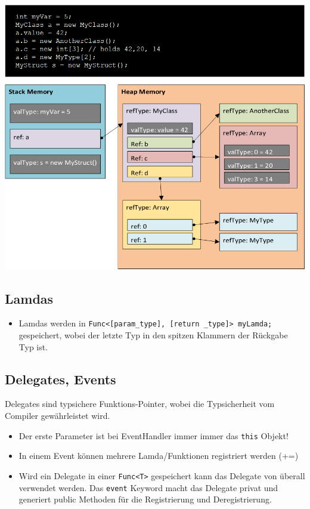 \documentclass[
a4paper,
oneside,
10pt,
fleqn,
headsepline,
toc=listofnumbered, 
bibliography=totocnumbered]{scrartcl}
\begin{document}
\begin{minipage}[t]{0.9\textwidth}
	\centering
	\includegraphics[width=0.8\linewidth]{images/reference_value_type}
\end{minipage}
\clearpage

\subsection{Lamdas}
\begin{itemize}
	\item Lamdas werden in \lstinline|Func<[param_type], [return _type]> myLamda;| gespeichert, wobei der letzte Typ in den spitzen Klammern der Rückgabe Typ ist.
\end{itemize}

\subsection{Delegates, Events}
Delegates sind typsichere Funktions-Pointer, wobei die Typsicherheit vom Compiler gewährleistet wird.
\begin{itemize}
	\item Der erste Parameter ist bei EventHandler immer immer das \lstinline|this| Objekt!
	\item In einem Event können mehrere Lamda/Funktionen registriert werden (+=)
	\item Wird ein Delegate in einer \lstinline|Func<T>| gespeichert kann das Delegate von überall verwendet werden. Das \lstinline|event| Keyword macht das Delegate privat und generiert public Methoden für die Registrierung und Deregistrierung.
\end{itemize}
\end{document}
